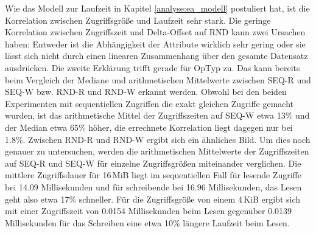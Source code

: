 \documentclass[
	12pt,
	a4paper,
	BCOR10mm,
	DIV14,
	listof=totoc,
	bibliography=totoc,
	headsepline
]{scrreprt}
\begin{document}
Wie das Modell zur Laufzeit in Kapitel \ref{analyse:ea_modell} postuliert hat, ist die Korrelation zwischen Zugriffsgröße und Laufzeit sehr stark.
Die geringe Korrelation zwischen Zugriffszeit und Delta-Offset auf RND kann zwei Ursachen haben: Entweder ist die Abhängigkeit der Attribute wirklich sehr gering oder sie lässt sich nicht durch einen linearen Zusammenhang über den gesamte Datensatz ausdrücken. 
Die zweite Erklärung trifft gerade für OpTyp zu. 
Das kann bereits beim Vergleich der Mediane und arithmetischen Mittelwerte zwischen SEQ-R und SEQ-W bzw. RND-R und RND-W erkannt werden.
Obwohl bei den beiden Experimenten mit sequentiellen Zugriffen die exakt gleichen Zugriffe gemacht wurden, ist das arithmetische Mittel der Zugriffszeiten auf SEQ-W etwa 13\% und der Median etwa 65\% höher, die errechnete Korrelation liegt dagegen nur bei 1.8\%. Zwischen RND-R und RND-W ergibt sich ein ähnliches Bild.
Um dies noch genauer zu untersuchen, werden die arithmetischen Mittelwerte der Zugriffszeiten auf SEQ-R und SEQ-W für einzelne Zugriffsgrößen miteinander verglichen.
Die mittlere Zugriffsdauer für 16\,MiB liegt im sequentiellen Fall für lesende Zugriffe bei 14.09 Millisekunden und für schreibende bei 16.96 Millisekunden, das Lesen geht also etwa 17\% schneller.
Für die Zugriffsgröße von einem 4\,KiB ergibt sich mit einer Zugriffszeit von 0.0154 Millisekunden beim Lesen gegenüber 0.0139 Millisekunden für das Schreiben eine etwa 10\% längere Laufzeit beim Lesen.

\begin{table}
	\centering
	\scriptsize
\end{table}
\end{document}

